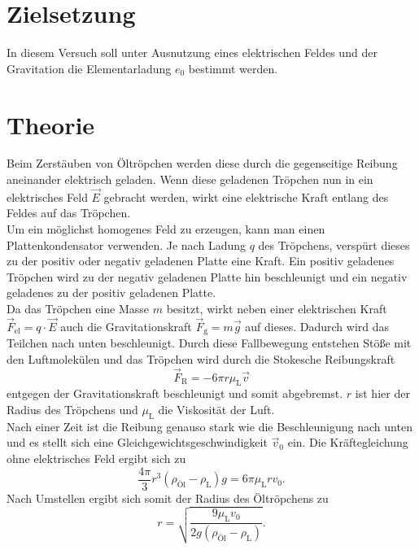\section{Zielsetzung}
\label{sec:Zielsetzung}

In diesem Versuch soll unter Ausnutzung eines elektrischen Feldes und der Gravitation
die Elementarladung $e_0$ bestimmt werden.

\section{Theorie}
\label{sec:Theorie}

Beim Zerstäuben von Öltröpchen werden diese durch die gegenseitige Reibung aneinander
elektrisch geladen. Wenn diese geladenen Tröpchen nun in ein elektrisches Feld $\vec{E}$ gebracht
werden, wirkt eine elektrische Kraft entlang des Feldes auf das Tröpchen.\\
Um ein möglichst homogenes Feld zu erzeugen, kann man einen Plattenkondensator verwenden.
Je nach Ladung $q$ des Tröpchens, verspürt dieses zu der positiv oder negativ geladenen Platte 
eine Kraft. Ein positiv geladenes Tröpchen wird zu der negativ geladenen Platte hin
beschleunigt und ein negativ geladenes zu der positiv geladenen Platte.\\
Da das Tröpchen eine Masse $m$ besitzt, wirkt neben einer elektrischen Kraft 
$\vec{F}_{\mathrm{el}} = q \cdot \vec{E}$ auch die Gravitationskraft $\vec{F}_{\mathrm{g}} = m \vec{g}$
auf dieses. Dadurch wird das Teilchen nach unten beschleunigt. Durch diese Fallbewegung
entstehen Stöße mit den Luftmolekülen und das Tröpchen wird durch die Stokesche
Reibungskraft 
\begin{equation}
    \label{eqn:Stokes}
    \vec{F}_{\mathrm{R}} = - 6 \pi r \mu_{\mathrm{L}} \vec{v}
\end{equation}
entgegen der Gravitationskraft beschleunigt und somit abgebremst. $r$ ist hier der 
Radius des Tröpchens und $\mu_{\mathrm{L}}$ die Viskosität der Luft.\\
Nach einer Zeit ist die Reibung genauso stark wie die Beschleunigung nach unten und es 
stellt sich eine Gleichgewichtsgeschwindigkeit $\vec{v}_0$ ein. Die Kräftegleichung
ohne elektrisches Feld ergibt sich zu 
\begin{equation*}
    \frac{4 \pi}{3} r^3 (\rho_{\mathrm{Öl}} - \rho_{\mathrm{L}}) g = 6 \pi \mu_{\mathrm{L}} r v_0.
\end{equation*}
Nach Umstellen ergibt sich somit der Radius des Öltröpchens zu 
\begin{equation*}
    r = \sqrt{\frac{9 \mu_{\mathrm{L}} v_0}{2 g (\rho_{\mathrm{Öl}} - \rho_{\mathrm{L}})}}.
\end{equation*}
